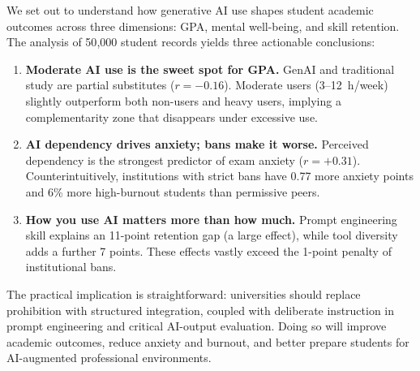 \documentclass[11pt]{article}
\begin{document}
We set out to understand how generative AI use shapes student academic outcomes
across three dimensions: GPA, mental well-being, and skill retention. The
analysis of 50{,}000 student records yields three actionable conclusions:

\begin{enumerate}
  \item \textbf{Moderate AI use is the sweet spot for GPA.} GenAI and
    traditional study are partial substitutes ($r = -0.16$). Moderate users
    (3--12~h/week) slightly outperform both non-users and heavy users, implying
    a complementarity zone that disappears under excessive use.

  \item \textbf{AI dependency drives anxiety; bans make it worse.} Perceived
    dependency is the strongest predictor of exam anxiety ($r = +0.31$).
    Counterintuitively, institutions with strict bans have 0.77 more anxiety
    points and 6\% more high-burnout students than permissive peers.

  \item \textbf{How you use AI matters more than how much.} Prompt engineering
    skill explains an 11-point retention gap (a large effect), while tool
    diversity adds a further 7 points. These effects vastly exceed the 1-point
    penalty of institutional bans.
\end{enumerate}

\noindent
The practical implication is straightforward: universities should replace
prohibition with structured integration, coupled with deliberate instruction in
prompt engineering and critical AI-output evaluation. Doing so will improve
academic outcomes, reduce anxiety and burnout, and better prepare students for
AI-augmented professional environments.
\end{document}
